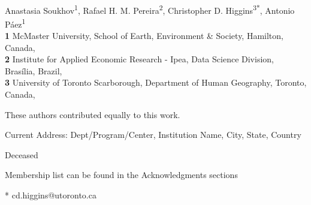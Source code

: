 \documentclass[
  10pt,
  letterpaper,
]{article}
\begin{document}
\vspace*{0.2in}

\begin{flushleft}
{\Large
\textbf{} %
}
\newline
\\
Anastasia Soukhov\textsuperscript{1}, Rafael H. M.
Pereira\textsuperscript{2}, Christopher D.
Higgins\textsuperscript{3*}, Antonio Páez\textsuperscript{1}
\\
\bigskip
\textbf{1} McMaster University, School of Earth, Environment \&
Society, Hamilton, Canada, \\ \textbf{2} Institute for Applied Economic
Research - Ipea, Data Science Division, Brasília,
Brazil, \\ \textbf{3} University of Toronto Scarborough, Department of
Human Geography, Toronto, Canada, 
\bigskip

% 
%
\Yinyang These authors contributed equally to this work.


\textcurrency Current Address: Dept/Program/Center, Institution Name, City, State, Country %

\dag Deceased

\textpilcrow Membership list can be found in the Acknowledgments
sections

* cd.higgins@utoronto.ca

\end{flushleft}
\end{document}
